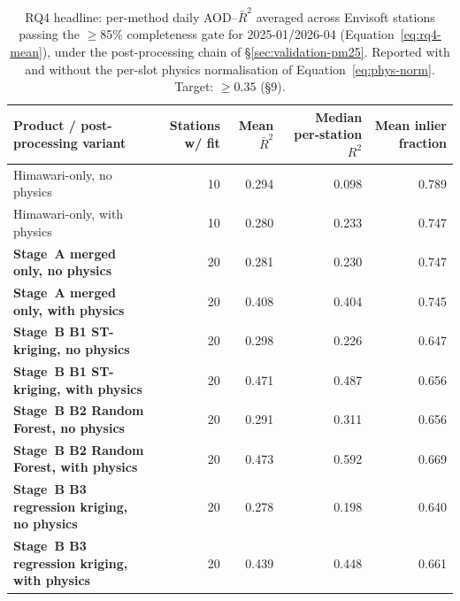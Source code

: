 \begin{table}[H]
\centering
\caption{RQ4 headline: per-method daily AOD--\PMtwo $\bar{R}^{2}$ averaged across Envisoft stations passing the $\geq$85\% completeness gate for 2025-01/2026-04 (Equation~\ref{eq:rq4-mean}), under the post-processing chain of \S\ref{sec:validation-pm25}. Reported with and without the per-slot physics normalisation of Equation~\ref{eq:phys-norm}. Target: $\ge 0.35$ (\S9).}
\label{tab:res-rq4-methods}
\small
\begin{tabular}{lrrrr}
\hline
\textbf{Product / post-processing variant} & \textbf{Stations w/ fit} & \textbf{Mean $\bar{R}^{2}$} & \textbf{Median per-station $R^{2}$} & \textbf{Mean inlier fraction} \\
\hline
Himawari-only, no physics & 10 & 0.294 & 0.098 & 0.789 \\
Himawari-only, with physics & 10 & 0.280 & 0.233 & 0.747 \\
\textbf{Stage~A merged only, no physics} & 20 & 0.281 & 0.230 & 0.747 \\
\textbf{Stage~A merged only, with physics} & 20 & 0.408 & 0.404 & 0.745 \\
\textbf{Stage~B B1 ST-kriging, no physics} & 20 & 0.298 & 0.226 & 0.647 \\
\textbf{Stage~B B1 ST-kriging, with physics} & 20 & 0.471 & 0.487 & 0.656 \\
\textbf{Stage~B B2 Random Forest, no physics} & 20 & 0.291 & 0.311 & 0.656 \\
\textbf{Stage~B B2 Random Forest, with physics} & 20 & 0.473 & 0.592 & 0.669 \\
\textbf{Stage~B B3 regression kriging, no physics} & 20 & 0.278 & 0.198 & 0.640 \\
\textbf{Stage~B B3 regression kriging, with physics} & 20 & 0.439 & 0.448 & 0.661 \\
\hline
\end{tabular}
\end{table}